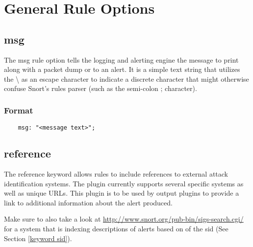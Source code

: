 \documentclass[english]{report}
\begin{document}
\section{General Rule Options}

\subsection{msg}

The msg rule option tells the logging and alerting engine the message to print
along with a packet dump or to an alert. It is a simple text string that
utilizes the \textbackslash{} as an escape character to indicate a discrete
character that might otherwise confuse Snort's rules parser (such as the
semi-colon ; character).

\subsubsection{Format}

\begin{verbatim}
    msg: "<message text>";
\end{verbatim}

\subsection{reference}

The reference keyword allows rules to include references to external attack
identification systems. The plugin currently supports several specific systems
as well as unique URLs. This plugin is to be used by output plugins to provide
a link to additional information about the alert produced.

Make sure to also take a look at
\url{http://www.snort.org/pub-bin/sigs-search.cgi/} for a system that is
indexing descriptions of alerts based on of the sid (See Section \ref{keyword
sid}).
\end{document}
